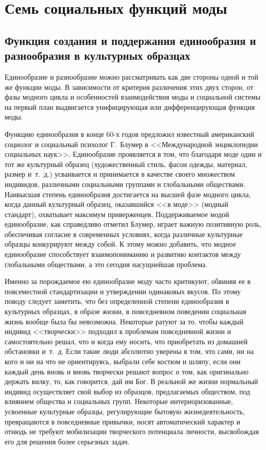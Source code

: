  \section{Семь социальных функций моды}
  \subsection{Функция создания и поддержания единообразия и разнообразия в
    культурных образцах}
    
  Единообразие и разнообразие можно рассматривать как две стороны одной и той
  же функции моды. В зависимости от критерия различения этих двух сторон, от
  фазы модного цикла и особенностей взаимодействия моды и социальной системы на
  первый план выдвигается унифицирующая или дифференцирующая функция моды.
  
  Функцию единообразия в конце 60-х годов предложил известный американский
  социолог и социальный психолог Г.~Блумер в <<Международной энциклопедии
  социальных наук>>. Единообразие проявляется в том, что благодаря моде один и
  тот же культурный образец (художественный стиль, фасон одежды, материал,
  размер и~т.~д.) усваивается и принимается в качестве своего множеством
  индивидов, различными социальными группами и глобальными обществами. Наивысшая
  степень единообразия достигается на высшей фазе модного цикла, когда данный
  культурный образец, оказавшийся <<в моде>> (модный стандарт), охватывает
  максимум приверженцев. Поддерживаемое модой единообразие, как справедливо
  отметил Блумер, играет важную позитивную роль, обеспечивая согласие в
  современных условиях, когда различные культурные образцы конкурируют между
  собой. К этому можно добавить, что модное единообразие способствует
  взаимопониманию и развитию контактов между глобальными обществами, а это
  сегодня насущнейшая проблема.
  
  Именно за порождаемое ею единообразие моду часто критикуют, обвиняя ее в
  повсеместной стандартизации и утверждении одинаковых вкусов. По этому поводу
  следует заметить, что без определенной степени единообразия в культурных
  образцах, в образе жизни, в повседневном поведении социальная жизнь вообще
  была бы невозможна. Некоторые ратуют за то, чтобы каждый индивид <<творчески>>
  подходил к проблемам повседневной жизни и самостоятельно решал, что и когда
  ему носить, что приобретать из домашней обстановки и~т.~д. Если такие люди
  абсолютно уверены в том, что сами, ни на кого и ни на что не ориентируясь,
  выбрали себе костюм и шляпу, если они каждый день вновь и вновь творчески
  решают вопрос о том, как оригинально держать вилку, то, как говорится, дай им
  Бог. В реальной же жизни нормальный индивид осуществляет свой выбор из
  образцов, предлагаемых обществом, под влиянием общества и социальных групп.
  Некоторые интериоризованные, усвоенные культурные образцы, регулирующие
  бытовую жизнедеятельность, превращаются в повседневные привычки, носят
  автоматический характер и отнюдь не требуют мобилизации творческого потенциала
  личности, высвобождая его для решения более серьезных задач.
  
